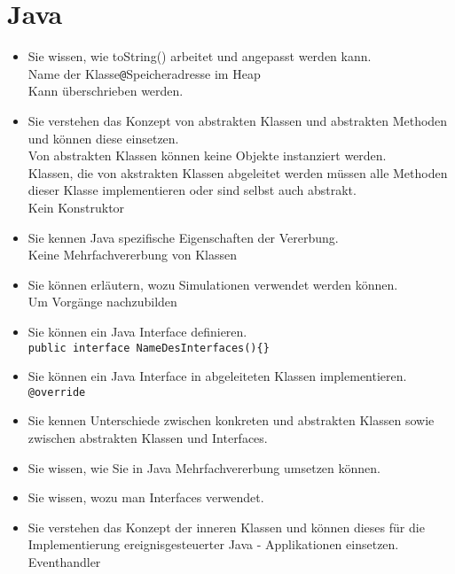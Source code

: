 \documentclass[a4paper, 10pt]{article}
\begin{document}
\section{Java}
\begin{itemize}
  \item Sie wissen, wie toString() arbeitet und angepasst werden kann. \\
        Name der Klasse\verb!@!Speicheradresse im Heap \\
        Kann überschrieben werden. 
  \item Sie verstehen das Konzept von abstrakten Klassen und abstrakten Methoden und können diese einsetzen. \\
        Von abstrakten Klassen können keine Objekte instanziert werden. \\
        Klassen, die von akstrakten Klassen abgeleitet werden müssen alle Methoden dieser Klasse implementieren oder sind selbst auch abstrakt. \\
        Kein Konstruktor
  \item Sie kennen Java spezifische Eigenschaften der Vererbung. \\
        Keine Mehrfachvererbung von Klassen
  \item Sie können erläutern, wozu Simulationen verwendet werden können. \\
        Um Vorgänge nachzubilden
  \item Sie können ein Java Interface definieren. \\
        \verb!public interface NameDesInterfaces(){}!
  \item Sie können ein Java Interface in abgeleiteten Klassen implementieren. \\
        \verb!@override!
  \item Sie kennen Unterschiede zwischen konkreten und abstrakten Klassen sowie zwischen abstrakten Klassen und Interfaces. \\
        
  \item Sie wissen, wie Sie in Java Mehrfachvererbung umsetzen können. \\
        
  \item Sie wissen, wozu man Interfaces verwendet. \\
        
  \item Sie verstehen das Konzept der inneren Klassen und können dieses für die Implementierung ereignisgesteuerter Java - Applikationen einsetzen. \\
        Eventhandler
\end{itemize}
\end{document}
